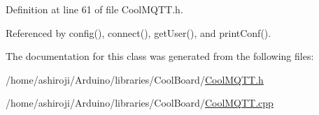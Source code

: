 Definition at line 61 of file Cool\+M\+Q\+T\+T.\+h.



Referenced by config(), connect(), get\+User(), and print\+Conf().



The documentation for this class was generated from the following files\+:\begin{DoxyCompactItemize}
\item 
/home/ashiroji/\+Arduino/libraries/\+Cool\+Board/\hyperlink{CoolMQTT_8h}{Cool\+M\+Q\+T\+T.\+h}\item 
/home/ashiroji/\+Arduino/libraries/\+Cool\+Board/\hyperlink{CoolMQTT_8cpp}{Cool\+M\+Q\+T\+T.\+cpp}\end{DoxyCompactItemize}
